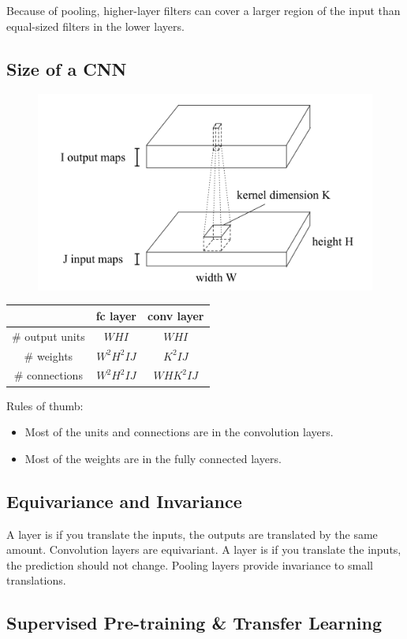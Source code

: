\documentclass[11pt]{article}
\begin{document}
\remark
Because of pooling, higher-layer filters can cover a larger region of the input than equal-sized filters in the lower layers.

\subsection{Size of a CNN}
\begin{figure}[H]
	\centering
	\includegraphics[scale=0.6]{p1.png}
\end{figure}
\begin{center}
\begin{tabular}{ |c|c|c| } 
 \hline
  & fc layer & conv layer \\ 
   \hline
 $\#$ output units & $WHI$ & $WHI$ \\ 
  \hline
 $\#$ weights & $W^2H^2IJ$ & $K^2IJ$ \\ 
  \hline
 $\#$ connections & $W^2H^2IJ$ & $WHK^2IJ$\\
 \hline
\end{tabular}
\end{center}
\remark
Rules of thumb:
\begin{itemize}
	\item Most of the units and connections are in the convolution layers.
	\item Most of the weights are in the fully connected layers.
\end{itemize}

\subsection{Equivariance and Invariance}
A layer is  if you translate the inputs, the outputs are translated by the same amount.
\example
Convolution layers are equivariant.
A layer is  if you translate the inputs, the prediction should not change.
\example
Pooling layers provide invariance to small translations.

\subsection{Supervised Pre-training \& Transfer Learning}
\end{document}
